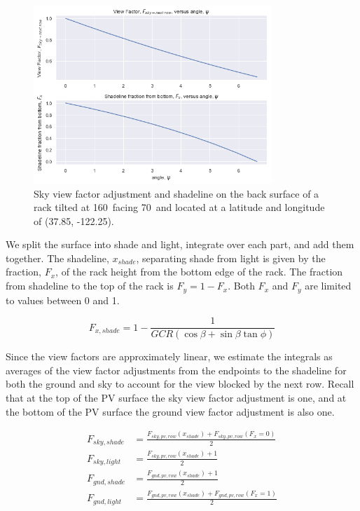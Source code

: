 \documentclass[conference]{IEEEtran}
\begin{document}
\begin{figure}
\centering
\includegraphics[width=9cm]{sky_diffuse_back_w-next_row.png}
\caption{Sky view factor adjustment and shadeline on the back surface of a rack tilted at 160\degree\ facing 70\degree\ and located at a latitude and longitude of (37.85\degree, -122.25\degree).}
\label{fig:sky-back-nextrow}
\end{figure}

We split the surface into shade and light, integrate over each part, and add them together.  The shadeline, $x_{shade}$, separating shade from light is given by the fraction, $F_x$, of the rack height from the bottom edge of the rack.  The fraction from shadeline to the top of the rack is $F_y = 1 - F_x$. Both $F_x$ and $F_y$ are limited to values between 0 and 1.

\begin{equation}
F_{x,shade} = 1 - \frac{1}{GCR\left(\cos \beta + \sin\beta \tan\phi \right)}
\end{equation}

Since the view factors are approximately linear, we estimate the integrals as averages of the view factor adjustments from the endpoints to the shadeline for both the ground and sky to account for the view blocked by the next row.  Recall that at the top of the PV surface the sky view factor adjustment is one, and at the bottom of the PV surface the ground view factor adjustment is also one.

\begin{align}
F_{sky,shade} &= \frac{F_{sky,pv,row}\left(x_{shade} \right)+F_{sky,pv,row}\left(F_x=0 \right)}{2}\\
F_{sky,light} &= \frac{F_{sky,pv,row}\left(x_{shade} \right)+1}{2}\\
F_{gnd,shade} &= \frac{F_{gnd,pv,row}\left(x_{shade} \right)+1}{2}\\
F_{gnd,light} &= \frac{F_{gnd,pv,row}\left(x_{shade} \right)+F_{gnd,pv,row}\left(F_x=1 \right)}{2}
\end{align}
\end{document}
